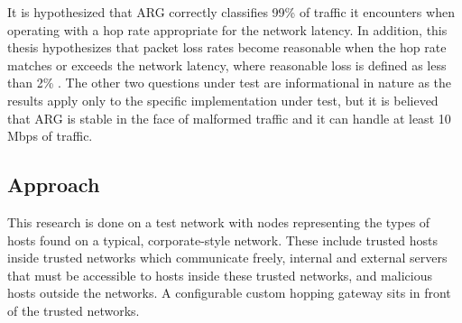

\par It is hypothesized that \ac{ARG} correctly classifies 99\% of traffic it encounters when operating with a hop rate appropriate for the network latency. In addition, this thesis hypothesizes that packet loss rates become reasonable when the hop rate matches or exceeds the network latency, where reasonable loss is defined as less than 2\% . The other two questions under test are informational in nature as the results apply only to the specific implementation under test, but it is believed that \ac{ARG} is stable in the face of malformed traffic and it can handle at least 10 \ac{Mbps} of traffic. 

\subsection{Approach}
\label{sec:approach}
\par This research is done on a test network with nodes representing the types of hosts found on a typical, corporate-style network. These include trusted hosts inside trusted networks which communicate freely, internal and external servers that must be accessible to hosts inside these trusted networks, and malicious hosts outside the networks. A configurable custom hopping gateway sits in front of the trusted networks. 

